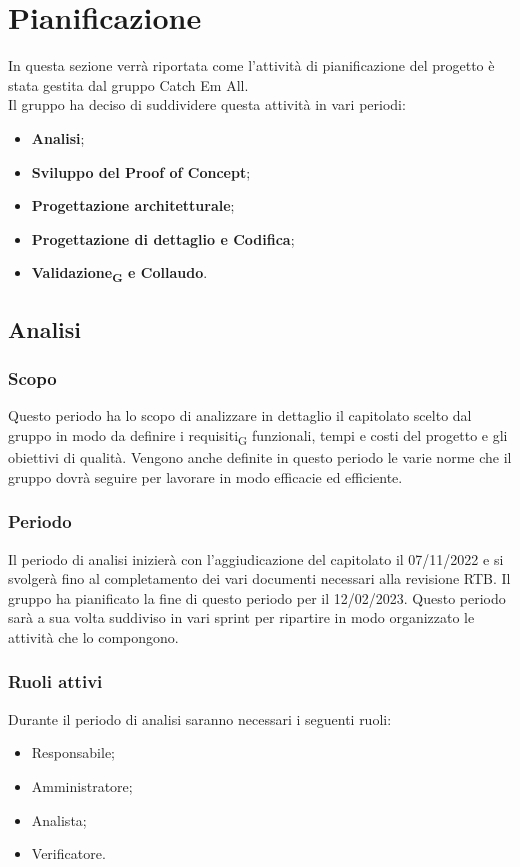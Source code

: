 \section{Pianificazione}
In questa sezione verrà riportata come l'attività di pianificazione del progetto è stata gestita dal gruppo Catch Em All. \\
Il gruppo ha deciso di suddividere questa attività in vari periodi: 
\begin{itemize}
	\item \textbf{Analisi};
	\item \textbf{Sviluppo del Proof of Concept};
	\item \textbf{Progettazione architetturale};
    \item \textbf{Progettazione di dettaglio e Codifica};
	\item \textbf{Validazione\textsubscript{G} e Collaudo}.
\end{itemize}

\subsection{Analisi}
\subsubsection{Scopo}
Questo periodo ha lo scopo di analizzare in dettaglio il capitolato scelto dal gruppo in modo da definire i requisiti\textsubscript{G} funzionali, tempi e costi del progetto e gli obiettivi di qualità. Vengono anche definite in questo periodo le varie norme che il gruppo dovrà seguire per lavorare in modo efficacie ed efficiente.

\subsubsection{Periodo}
Il periodo di analisi inizierà con l'aggiudicazione del capitolato il 07/11/2022 e si svolgerà fino al completamento dei vari documenti necessari alla revisione  RTB. Il gruppo ha pianificato la fine di questo periodo per il 12/02/2023. Questo periodo sarà a sua volta suddiviso in vari sprint per ripartire in modo organizzato le attività che lo compongono.

\subsubsection{Ruoli attivi}
Durante il periodo di analisi saranno necessari i seguenti ruoli:
\begin{itemize}
	\item Responsabile;
	\item Amministratore;
	\item Analista;
	\item Verificatore.
\end{itemize}

